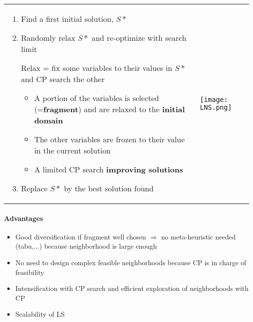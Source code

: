 \begin{tabular}{m{10cm}m{6cm}}
    \begin{enumerate}

        \item Find a first initial solution, $S*$
        \item Randomly relax $S*$ and re-optimize with search limit

            Relax = fix some variables to their values in $S*$ and CP
            search the other

            \begin{itemize}
                \item A portion of the variables is selected (=\textbf{fragment})
                    and are relaxed to the \textbf{initial domain}
                \item The other variables are frozen to their value in the current solution
                \item A limited CP search \textbf{improving solutions}
            \end{itemize}

        \item Replace $S*$ by the best solution found
    \end{enumerate}

    &
    \texttt{[image: LNS.png]}
\end{tabular}

\paragraph{Advantages}
\begin{itemize}
    \item Good diversification if fragment well chosen $\Rightarrow$ no
        meta-heuristic needed (tabu,...) because neighborhood is large
        enough
    \item No need to design complex feasible neighborhoods because CP
        is in charge of feasibility

    \item Intensification with CP search and efficient 
        exploration of neighborhoods with CP
    \item Scalability of LS
\end{itemize}



